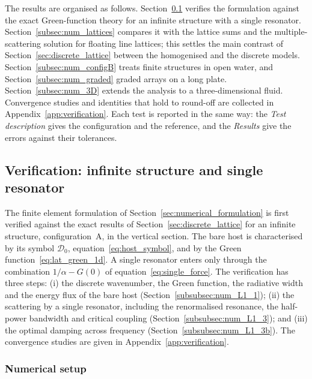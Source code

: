 {\color{red}
The results are organised as follows. Section~\ref{subsec:num_verification_A} verifies the formulation against the exact Green-function theory for an infinite structure with a single resonator. Section~\ref{subsec:num_lattices} compares it with the lattice sums and the multiple-scattering solution for floating line lattices; this settles the main contrast of Section~\ref{sec:discrete_lattice} between the homogenised and the discrete models. Section~\ref{subsec:num_configB} treats finite structures in open water, and Section~\ref{subsec:num_graded} graded arrays on a long plate. Section~\ref{subsec:num_3D} extends the analysis to a three-dimensional fluid. Convergence studies and identities that hold to round-off are collected in Appendix~\ref{app:verification}. Each test is reported in the same way: the \emph{Test description} gives the configuration and the reference, and the \emph{Results} give the errors against their tolerances.

\subsection{Verification: infinite structure and single resonator}\label{subsec:num_verification_A}

The finite element formulation of Section~\ref{sec:numerical_formulation} is first verified against the exact results of Section~\ref{sec:discrete_lattice} for an infinite structure, configuration~A, in the vertical section. The bare host is characterised by its symbol $\mathcal{D}_0$, equation~\eqref{eq:host_symbol}, and by the Green function~\eqref{eq:lat_green_1d}. A single resonator enters only through the combination $1/\alpha-G(0)$ of equation~\eqref{eq:single_force}. The verification has three steps: (i) the discrete wavenumber, the Green function, the radiative width and the energy flux of the bare host (Section~\ref{subsubsec:num_L1_1}); (ii) the scattering by a single resonator, including the renormalised resonance, the half-power bandwidth and critical coupling (Section~\ref{subsubsec:num_L1_3}); and (iii) the optimal damping across frequency (Section~\ref{subsubsec:num_L1_3b}). The convergence studies are given in Appendix~\ref{app:verification}.

\subsubsection{Numerical setup}\label{subsubsec:num_setup_A}

}
